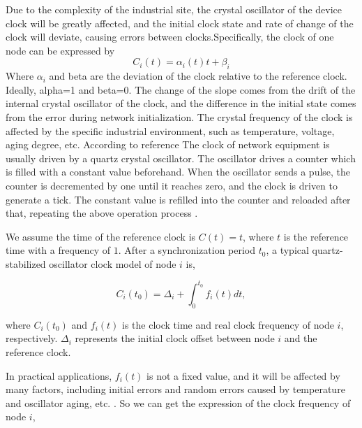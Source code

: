 \documentclass[conference]{IEEEtran}
\begin{document}
	Due to the complexity of the industrial site, the crystal oscillator of the device clock will be greatly affected, and the initial clock state and rate of change of the clock will deviate, causing errors between clocks.Specifically, the clock of one node can be expressed by
\begin{equation*}
C_i(t) = \alpha _i(t)t + \beta _i \tag{1}
\end{equation*}
Where $\alpha_i$ and beta are the deviation of the clock relative to the reference clock. Ideally, alpha=1 and beta=0. The change of the slope comes from the drift of the internal crystal oscillator of the clock, and the difference in the initial state comes from the error during network initialization. The crystal frequency of the clock is affected by the specific industrial environment, such as temperature, voltage, aging degree, etc. According to reference \cite{ref33}
The clock of network equipment is usually driven by a quartz crystal oscillator. The oscillator drives a counter which is filled with a constant value beforehand. When the oscillator sends a pulse, the counter is decremented by one until it reaches zero, and the clock is driven to generate a tick. The constant value is refilled into the counter and reloaded after that, repeating the above operation process \cite{ref12}.

We assume the time of the reference clock is $C(t)=t$, where $t$ is the reference time with a frequency of $1$. After a synchronization period $t_0$, a typical quartz-stabilized oscillator clock model of node $i$ is,

\begin{equation}
C_i(t_0) = \Delta_i  + \int_0^{t_0} {f_i(t)dt}, \label {eq1}
\end{equation}

\noindent where $C_i(t_0)$ and $f_i(t)$ is the clock time and real clock frequency of node $i$, respectively. $\Delta_i$ represents the initial clock offset between node $i$ and the reference clock.

In practical applications, $f_i(t)$ is not a fixed value, and it will be affected by many factors, including initial errors and random errors caused by temperature and oscillator aging, etc. \cite{ref4, ref27}. So we can get the expression of the clock frequency of node $i$, %
\end{document}
